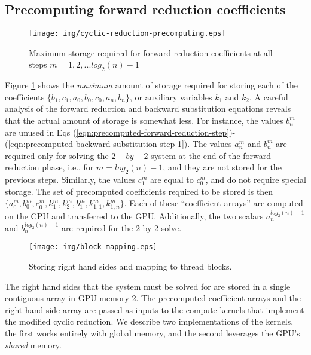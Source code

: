 \subsection{Precomputing forward reduction coefficients}

\begin{figure}
\begin{center}
\texttt{[image: img/cyclic-reduction-precomputing.eps]}
\end{center}
\caption{Maximum storage required for forward reduction coefficients
at all steps $m=1, 2, ... log_2(n)-1$}
\label{fig:cyclic-reduction-precomputing}
\end{figure}

Figure \ref{fig:cyclic-reduction-precomputing}
shows the
\emph{maximum} amount of storage required for
storing each of the coefficients
$\{b_1, c_1, a_0, b_0, c_0, a_n, b_n\}$,
or auxiliary variables $k_1$ and $k_2$.
A careful analysis of the
forward reduction and backward substitution equations
reveals that the actual amount of storage is somewhat less.
For instance,
the values $b_n^m$ are unused
in Eqs (\ref{eqn:precomputed-forward-reduction-step})-
(\ref{eqn:precomputed-backward-substitution-step-1}).
The values $a_n^m$ and $b_n^m$ are
required only for solving the $2-by-2$
system at the end of the forward reduction phase,
i.e., for $m=log_2(n)-1$,
and they are not stored for the previous steps.
Similarly, the values $c_1^m$ are equal to $c_0^m$,
and do not require special storage.
The set of precomputed coefficients required to be stored is then
$\{a_0^m, b_0^m, c_0^m, k_1^m, k_2^m, b_1^m, k_{1,1}^m, k_{1,n}^m\}$.
Each of these ``coefficient arrays'' are computed on the CPU
and transferred to the GPU.
Additionally, the two scalars $a_n^{log_2(n)-1}$ and $b_n^{log_2(n)-1}$
are required for the 2-by-2 solve.
%
\begin{figure}
\begin{center}
\texttt{[image: img/block-mapping.eps]}
\end{center}
\caption{Storing right hand sides and mapping to thread blocks.}
\label{fig:block-mapping}
\end{figure}
%
The right hand sides that the system must be solved for
are stored in a single contiguous array in GPU memory
\ref{fig:block-mapping}.
The precomputed coefficient arrays and the right hand side array
are passed as inputs to the compute kernels that implement
the modified cyclic reduction.
We describe two implementations of the kernels,
the first works entirely with global memory,
and the second leverages the GPU's \emph{shared} memory.

